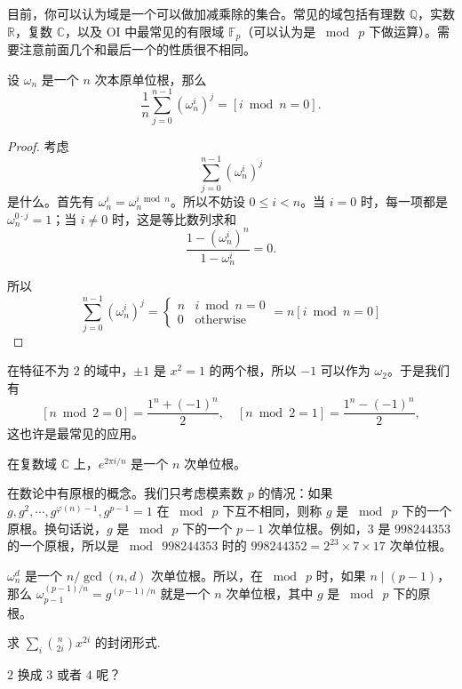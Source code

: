     \begin{remark}
            目前，你可以认为域是一个可以做加减乘除的集合。常见的域包括有理数 $\mathbb Q$，实数 $\mathbb R$，复数 $\mathbb C$，以及 OI 中最常见的有限域 $\mathbb F_p$（可以认为是 $\bmod\ p$ 下做运算）。需要注意前面几个和最后一个的性质很不相同。
    \end{remark}
    \begin{theorem}[“单位根反演”]
        设 $\omega_n$ 是一个 $n$ 次本原单位根，那么
        $$
        \frac{1}{n}\sum_{j=0}^{n-1}(\omega_n^i)^j=[i\bmod n=0].
        $$
    \end{theorem}
    \begin{proof}
        考虑
        $$
        \sum_{j=0}^{n-1}(\omega_n^i)^j
        $$
        是什么。首先有 $\omega_n^{i}=\omega_n^{i\bmod n}$。所以不妨设 $0\le i<n$。当 $i=0$ 时，每一项都是 $\omega_n^{0\cdot j}=1$；当 $i\ne 0$ 时，这是等比数列求和
        $$
        \frac{1-(\omega_n^i)^n}{1-\omega_n^i}=0.
        $$

        所以
        $$
        \sum_{j=0}^{n-1}(\omega_n^i)^j=\begin{cases}
            n&i\bmod n=0\\
            0&\text{otherwise}
        \end{cases}
        =n[i\bmod n=0]
        $$
    \end{proof}
    \begin{example}
        在特征不为 $2$ 的域中，$\pm 1$ 是 $x^2=1$ 的两个根，所以 $-1$ 可以作为 $\omega_2$。于是我们有
        $$
        [n\bmod 2=0]=\frac{1^n+(-1)^n}{2},\quad [n\bmod 2=1]=\frac{1^n-(-1)^n}{2},
        $$
        这也许是最常见的应用。

        在复数域 $\mathbb C$ 上，$e^{2\pi i/n}$ 是一个 $n$ 次单位根。

        在数论中有原根的概念。我们只考虑模素数 $p$ 的情况：如果 $g,g^2,\cdots,g^{\varphi(n)-1},g^{p-1}=1$ 在 $\bmod\ p$ 下互不相同，则称 $g$ 是 $\bmod\ p$ 下的一个原根。换句话说，$g$ 是 $\bmod\ p$ 下的一个 $p-1$ 次单位根。例如，$3$ 是 $998244353$ 的一个原根，所以是 $\bmod\ 998244353$ 时的 $998244352=2^{23}\times 7\times 17$ 次单位根。

        $\omega_n^{d}$ 是一个 $n/\gcd(n,d)$ 次单位根。所以，在 $\bmod\ p$ 时，如果 $n\mid (p-1)$，那么 $\omega_{p-1}^{(p-1)/n}=g^{(p-1)/n}$ 就是一个 $n$ 次单位根，其中 $g$ 是 $\bmod\ p$ 下的原根。
    \end{example}
    \begin{example}
            求 $\sum_{i}\binom{n}{2i}x^{2i}$ 的封闭形式.

    $2$ 换成 $3$ 或者 $4$ 呢？
    \end{example}
